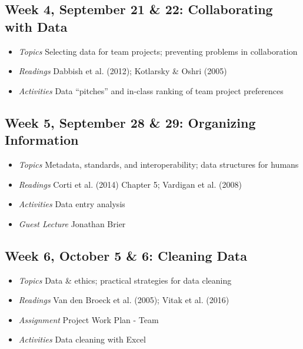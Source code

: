 \documentclass[11pt]{article}
\begin{document}
\subsection*{Week 4, September 21 \& 22: Collaborating with Data} 

\begin{itemize}
\item \textit{Topics} Selecting data for team projects; preventing problems in collaboration %
\item \textit{Readings} Dabbish et al. (2012); Kotlarsky \& Oshri (2005)
\item \textit{Activities} Data ``pitches'' and in-class ranking of team project preferences
\end{itemize}

\subsection*{Week 5, September 28 \& 29: Organizing Information}

\begin{itemize}
\item \textit{Topics} Metadata, standards, and interoperability; data structures for humans
\item \textit{Readings} Corti et al. (2014) Chapter 5; Vardigan et al. (2008)
\item \textit{Activities} Data entry analysis
\item \textit{Guest Lecture} Jonathan Brier
\end{itemize}

\subsection*{Week 6, October 5 \& 6: Cleaning Data}

\begin{itemize}
\item \textit{Topics} Data \& ethics; practical strategies for data cleaning
\item \textit{Readings} Van den Broeck et al. (2005); Vitak et al. (2016)
\item \textit{Assignment} Project Work Plan - Team
\item \textit{Activities} Data cleaning with Excel
\end{itemize}
\end{document}
